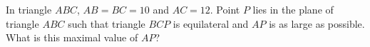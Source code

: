 In triangle $ABC$, $AB=BC=10$ and $AC=12$. Point $P$ lies in the plane of triangle $ABC$ such that triangle $BCP$ is equilateral and $AP$ is as large as possible. What is this maximal value of $AP$?
